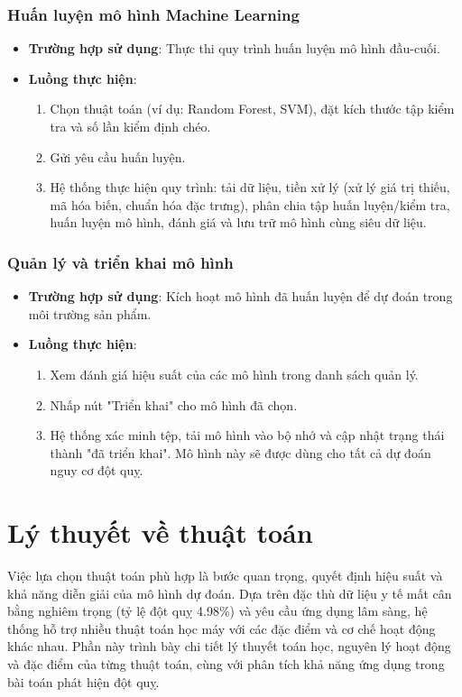 ﻿\documentclass{article}
\begin{document}
\subsubsection{Huấn luyện mô hình Machine Learning}
\begin{itemize}
    \item \textbf{Trường hợp sử dụng}: Thực thi quy trình huấn luyện mô hình đầu-cuối.
    \item \textbf{Luồng thực hiện}:
        \begin{enumerate}
            \item Chọn thuật toán (ví dụ: Random Forest, SVM), đặt kích thước tập kiểm tra và số lần kiểm định chéo.
            \item Gửi yêu cầu huấn luyện.
            \item Hệ thống thực hiện quy trình: tải dữ liệu, tiền xử lý (xử lý giá trị thiếu, mã hóa biến, chuẩn hóa đặc trưng), phân chia tập huấn luyện/kiểm tra, huấn luyện mô hình, đánh giá và lưu trữ mô hình cùng siêu dữ liệu.
        \end{enumerate}
\end{itemize}

\subsubsection{Quản lý và triển khai mô hình}
\begin{itemize}
    \item \textbf{Trường hợp sử dụng}: Kích hoạt mô hình đã huấn luyện để dự đoán trong môi trường sản phẩm.
    \item \textbf{Luồng thực hiện}:
        \begin{enumerate}
            \item Xem đánh giá hiệu suất của các mô hình trong danh sách quản lý.
            \item Nhấp nút "Triển khai" cho mô hình đã chọn.
            \item Hệ thống xác minh tệp, tải mô hình vào bộ nhớ và cập nhật trạng thái thành "đã triển khai". Mô hình này sẽ được dùng cho tất cả dự đoán nguy cơ đột quỵ.
        \end{enumerate}
\end{itemize}

\section{Lý thuyết về thuật toán}
Việc lựa chọn thuật toán phù hợp là bước quan trọng, quyết định hiệu suất và khả năng diễn giải của mô hình dự đoán. Dựa trên đặc thù dữ liệu y tế mất cân bằng nghiêm trọng (tỷ lệ đột quỵ 4.98\%) và yêu cầu ứng dụng lâm sàng, hệ thống hỗ trợ nhiều thuật toán học máy với các đặc điểm và cơ chế hoạt động khác nhau. Phần này trình bày chi tiết lý thuyết toán học, nguyên lý hoạt động và đặc điểm của từng thuật toán, cùng với phân tích khả năng ứng dụng trong bài toán phát hiện đột quỵ.
\end{document}
